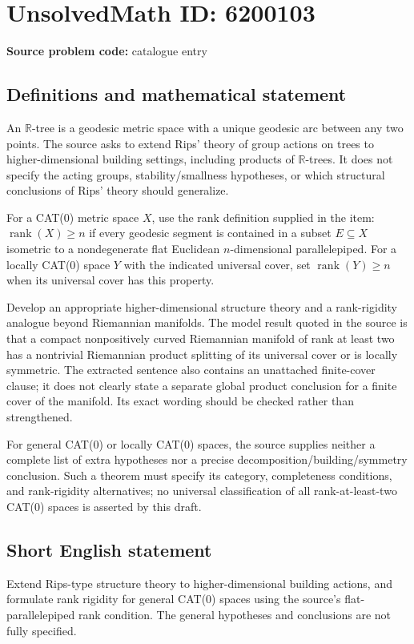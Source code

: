 \documentclass[11pt]{article}
\begin{document}
\section*{UnsolvedMath ID: 6200103}
\textbf{Source problem code:} catalogue entry
\subsection{Definitions and mathematical statement}
An $\mathbb R$-tree is a geodesic metric space with a unique geodesic arc between any two points. The source asks to extend Rips' theory of group actions on trees to higher-dimensional building settings, including products of $\mathbb R$-trees. It does not specify the acting groups, stability/smallness hypotheses, or which structural conclusions of Rips' theory should generalize.

For a CAT(0) metric space $X$, use the rank definition supplied in the item: $\operatorname{rank}(X)\geq n$ if every geodesic segment is contained in a subset $E\subseteq X$ isometric to a nondegenerate flat Euclidean $n$-dimensional parallelepiped. For a locally CAT(0) space $Y$ with the indicated universal cover, set $\operatorname{rank}(Y)\geq n$ when its universal cover has this property.

Develop an appropriate higher-dimensional structure theory and a rank-rigidity analogue beyond Riemannian manifolds. The model result quoted in the source is that a compact nonpositively curved Riemannian manifold of rank at least two has a nontrivial Riemannian product splitting of its universal cover or is locally symmetric. The extracted sentence also contains an unattached finite-cover clause; it does not clearly state a separate global product conclusion for a finite cover of the manifold. Its exact wording should be checked rather than strengthened.

For general CAT(0) or locally CAT(0) spaces, the source supplies neither a complete list of extra hypotheses nor a precise decomposition/building/symmetry conclusion. Such a theorem must specify its category, completeness conditions, and rank-rigidity alternatives; no universal classification of all rank-at-least-two CAT(0) spaces is asserted by this draft.
\subsection{Short English statement}
Extend Rips-type structure theory to higher-dimensional building actions, and formulate rank rigidity for general CAT(0) spaces using the source's flat-parallelepiped rank condition. The general hypotheses and conclusions are not fully specified.
\end{document}
